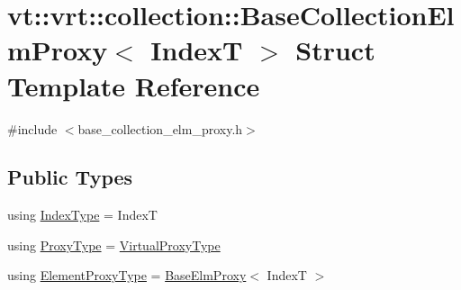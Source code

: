 \hypertarget{structvt_1_1vrt_1_1collection_1_1_base_collection_elm_proxy}{}\section{vt\+:\+:vrt\+:\+:collection\+:\+:Base\+Collection\+Elm\+Proxy$<$ IndexT $>$ Struct Template Reference}
\label{structvt_1_1vrt_1_1collection_1_1_base_collection_elm_proxy}


{\ttfamily \#include $<$base\+\_\+collection\+\_\+elm\+\_\+proxy.\+h$>$}

\subsection*{Public Types}
\begin{DoxyCompactItemize}
\item 
using \hyperlink{structvt_1_1vrt_1_1collection_1_1_base_collection_elm_proxy_af599b7a386e6cb65156cd57917ef8b07}{Index\+Type} = IndexT
\item 
using \hyperlink{structvt_1_1vrt_1_1collection_1_1_base_collection_elm_proxy_a1a60a46fe46552edfaf5c8785e283615}{Proxy\+Type} = \hyperlink{namespacevt_a1b417dd5d684f045bb58a0ede70045ac}{Virtual\+Proxy\+Type}
\item 
using \hyperlink{structvt_1_1vrt_1_1collection_1_1_base_collection_elm_proxy_aeb2058caef8c935a8a88654787672305}{Element\+Proxy\+Type} = \hyperlink{structvt_1_1vrt_1_1collection_1_1_base_elm_proxy}{Base\+Elm\+Proxy}$<$ IndexT $>$
\end{DoxyCompactItemize}
